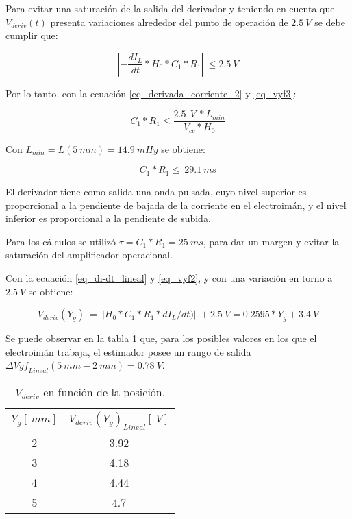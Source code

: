 Para evitar una saturación de la salida del derivador y teniendo en cuenta que $V_{deriv}(t)$ presenta variaciones alrededor del punto de operación de $2.5\:V$ se debe cumplir que:

\begin{equation} \label{eq_vyf3}
	\left|-\frac{dI_L}{dt}*H_0*C_1*R_1\right|\ \le 2.5\:V
\end{equation}

Por lo tanto, con la ecuación \ref{eq_derivada_corriente_2} y \ref{eq_vyf3}:

\begin{equation} \label{eq_condicionC1-R1}
	C_1*R_1\le\frac{2.5\ \:V\ *L_{min}}{V_{cc}*H_0}
\end{equation}

Con $L_{min}= L(5\: mm) = 14.9\: mHy$ se obtiene: 

\begin{equation} \label{eq_condicionC1-R1-2}
	C_1*R_1\le\ 29.1\ ms
\end{equation}

El derivador tiene como salida una onda pulsada, cuyo nivel superior es proporcional a la pendiente de bajada de la corriente en el electroimán, y el nivel inferior es proporcional a la pendiente de subida.

Para los cálculos se utilizó $\tau = C_1*R_1= 25\:ms$, para dar un margen y evitar la saturación del amplificador operacional.  

Con la ecuación \ref{eq_di-dt_lineal} y \ref{eq_vyf2}, y con una variación en torno a $2.5\:V$ se obtiene:

\begin{equation} \label{eq_Vyf-lineal}
	V_{deriv}(Y_g)\ =\ |H_0*C_1*R_1*dI_L/dt)|\ +2.5\:V=0.2595*Y_g+3.4\:V
\end{equation}

Se puede observar en la tabla \ref{tab_Vyf_vs_y} que, para los posibles valores en los que el electroimán trabaja, el estimador posee un rango de salida ${\mathit{\Delta}{Vyf}_{Lineal}}(5\:mm-2\:mm)= 0.78\:V$.

\begin{table}[H]
	\begin{center}
		\begin{tabular}{| c | c |}
			\hline
			$Y_g[\:mm]$ & ${V_{deriv}(Y_g)}_{Lineal} [\:V]$\\ \hline
			2 & 3.92 \\ \hline 
			3 & 4.18 \\ \hline 
			4 & 4.44 \\ \hline 
			5 & 4.7 \\ \hline 
		\end{tabular}
		\caption{$V_{deriv}$ en función de la posición.}
		\label{tab_Vyf_vs_y}
	\end{center}
\end{table}

